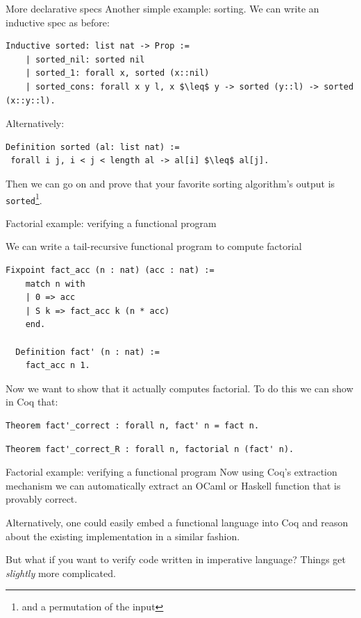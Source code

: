 \documentclass[10pt,usenames,dvipsnames,landscape]{beamer}
\begin{document}
\begin{frame}[fragile]{More declarative specs}
  Another simple example: sorting. We can write an inductive spec as before:
  \begin{lstlisting}[language=Coq]
    Inductive sorted: list nat -> Prop :=
    | sorted_nil: sorted nil
    | sorted_1: forall x, sorted (x::nil)
    | sorted_cons: forall x y l, x $\leq$ y -> sorted (y::l) -> sorted (x::y::l).  
  \end{lstlisting}

Alternatively:

 \begin{lstlisting}[language=Coq]
Definition sorted (al: list nat) :=
 forall i j, i < j < length al -> al[i] $\leq$ al[j].
  \end{lstlisting}

Then we can go on and prove that your favorite sorting algorithm's output is \texttt{sorted}\footnote{and a permutation of the input}.

\end{frame}

\begin{frame}[fragile]{Factorial example: verifying a functional program}

  We can write a tail-recursive functional program to compute factorial

  \begin{lstlisting}[language=Coq]
  Fixpoint fact_acc (n : nat) (acc : nat) :=
    match n with
    | 0 => acc
    | S k => fact_acc k (n * acc)
    end.

  Definition fact' (n : nat) :=
    fact_acc n 1.

  \end{lstlisting}

  Now we want to show that it actually computes factorial. To do this we can show in Coq that:
   \begin{lstlisting}[language=Coq]
  Theorem fact'_correct : forall n, fact' n = fact n.
  \end{lstlisting}

    \begin{lstlisting}[language=Coq]
  Theorem fact'_correct_R : forall n, factorial n (fact' n).
  \end{lstlisting}
   
\end{frame}

\begin{frame}{Factorial example: verifying a functional program}
  Now using Coq's extraction mechanism we can automatically extract an OCaml or Haskell function that is provably correct.

  Alternatively, one could easily embed a functional language into Coq and reason about the existing implementation in a similar fashion.

  But what if you want to verify code written in imperative language? Things get \emph{slightly} more complicated.
\end{frame}
\end{document}
